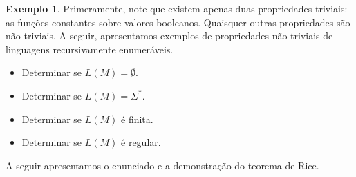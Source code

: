 \documentclass[a4paper]{article}
\theoremstyle{definition}
\newtheorem{Example}{Exemplo}
\begin{document}
  \begin{Example}
    Primeramente, note que existem apenas duas propriedades triviais: as funções
    constantes sobre valores booleanos. Quaisquer outras propriedades são não
    triviais. A seguir, apresentamos exemplos de propriedades não triviais de
    linguagens recursivamente enumeráveis.
    \begin{itemize}
       \item Determinar se $L(M) = \emptyset$.
       \item Determinar se $L(M) = \Sigma^*$.
       \item Determinar se $L(M)$ é finita.
       \item Determinar se $L(M)$ é regular.
    \end{itemize}
  \end{Example}

  A seguir apresentamos o enunciado e a demonstração do teorema de Rice.
\end{document}
